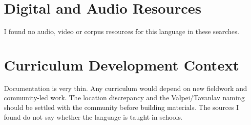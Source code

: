 \documentclass[12pt]{article}
\begin{document}
\section{Digital and Audio Resources}
I found no audio, video or corpus resources for this language in these searches.

\section{Curriculum Development Context}
Documentation is very thin. Any curriculum would depend on new fieldwork and community-led work. The location discrepancy and the Valpei/Tavanlav naming should be settled with the community before building materials. The sources I found do not say whether the language is taught in schools.
\end{document}
